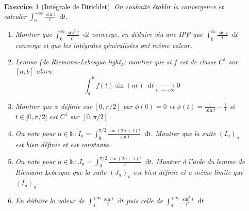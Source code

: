 \documentclass[12pt,a4paper]{article}
\newcommand{\N}{\mathbb{N}}
\newcommand{\diff}{\mathop{}\mathopen{}\mathrm{d}}%
{%
\theoremstyle{break}
\theoremprework{%
\rule{0.5\linewidth}{0.3pt}}
\theorempostwork{\hfill%
\rule{0.5\linewidth}{0.3pt}}
\theoremheaderfont{\scshape}
\theoremseparator{ ---}
\newtheorem{Prop}{%
\textcolor{blue}{Proposition}}[section]
}
\theoremstyle{break}
\newtheorem{Exo}{Exercice}
\begin{document}
\begin{Exo}[Intégrale de Dirichlet]
On souhaite établir la convergence et calculer $\displaystyle\int_0^{+\infty}\frac{\sin t}{t}\diff t$.
\begin{enumerate}
	\item
		Montrer que $\displaystyle\int_{0}^{\infty}\frac{\sin^2t}{t^2}\diff t$ converge, en déduire via une IPP que $\displaystyle\int_{0}^{\infty}\frac{\sin t}{t}\diff t$ converge et que les intégrales généralisées ont même valeur.
	\item
	Lemme (de Riemann-Lebesgue light): montrer que si $f$ est de classe $C^1$ sur $[a,b]$ alors:
	$$\int_a^b f(t)\sin(nt)\diff t\underset{n\to +\infty}{\to}0$$

	\item
	Montrer que $\phi$ définie sur $[0,\pi/2]$ par $\phi(0)=0$ et $\phi(t)=\frac{1}{\sin t}-\frac{1}{t}$ si $t\in]0,\pi/2]$ est $C^1$ sur $[0,\pi/2]$.
	\item
	On note pour $n\in\N:I_n=\int_{0}^{\pi/2}\frac{\sin(2n+1)t}{\sin t}\diff t$. Montrer que la suite $(I_n)_n$ est bien définie et est constante.
	\item
	On note pour $n\in\N:J_n=\int_{0}^{\pi/2}\frac{\sin(2n+1)t}{ t}\diff t$. Montrer à l'aide du lemme de Riemann-Lebesgue que la suite $(J_n)_n$ est bien définie et a même limite que $(I_n)_n$.
	\item En déduire la valeur de $\displaystyle\int_0^{+\infty}\frac{\sin t}{t}\diff t$ puis celle de $\displaystyle\int_0^{+\infty}\frac{\sin^2 t}{t^2}\diff t$.
\end{enumerate}
\end{Exo}
\end{document}
